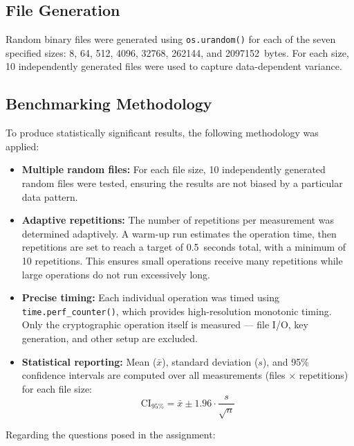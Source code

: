 \documentclass[10pt,a4paper]{article}
\begin{document}
\subsection{File Generation}

Random binary files were generated using \texttt{os.urandom()} for each of the seven specified sizes: 8, 64, 512, 4096, 32768, 262144, and 2097152~bytes. For each size, 10 independently generated files were used to capture data-dependent variance.

\subsection{Benchmarking Methodology}
\label{sec:methodology}

To produce statistically significant results, the following methodology was applied:

\begin{itemize}
    \item \textbf{Multiple random files:} For each file size, 10 independently generated random files were tested, ensuring the results are not biased by a particular data pattern.
    \item \textbf{Adaptive repetitions:} The number of repetitions per measurement was determined adaptively. A warm-up run estimates the operation time, then repetitions are set to reach a target of 0.5~seconds total, with a minimum of 10 repetitions. This ensures small operations receive many repetitions while large operations do not run excessively long.
    \item \textbf{Precise timing:} Each individual operation was timed using \texttt{time.perf\_counter()}, which provides high-resolution monotonic timing. Only the cryptographic operation itself is measured --- file I/O, key generation, and other setup are excluded.
    \item \textbf{Statistical reporting:} Mean ($\bar{x}$), standard deviation ($s$), and 95\% confidence intervals are computed over all measurements (files $\times$ repetitions) for each file size:
    \[
        \text{CI}_{95\%} = \bar{x} \pm 1.96 \cdot \frac{s}{\sqrt{n}}
    \]
\end{itemize}

Regarding the questions posed in the assignment:
\end{document}
